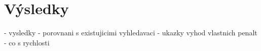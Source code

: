\chapter{Výsledky}
- vysledky
  - porovnani s existujicimi vyhledavaci
  - ukazky vyhod vlastnich penalt
  - co s rychlosti
